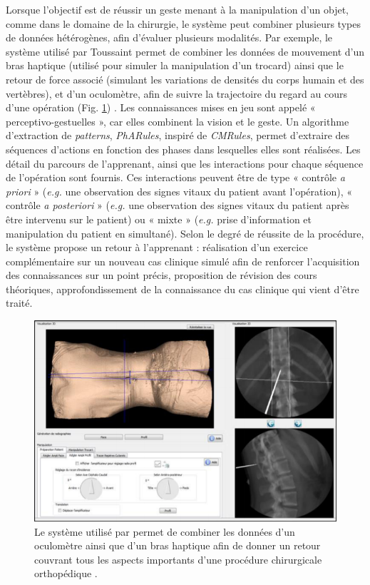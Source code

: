 Lorsque l'objectif est de réussir un geste menant à la manipulation d'un objet,  comme dans le domaine de la chirurgie, le système peut combiner plusieurs types de données hétérogènes, afin d'évaluer plusieurs modalités. Par exemple, le système utilisé par Toussaint  permet de combiner les données de mouvement d'un bras haptique (utilisé pour simuler la manipulation d'un trocard) ainsi que le retour de force associé (simulant les variations de densités du corps humain et des vertèbres), et d'un oculomètre, afin de suivre la trajectoire du regard au cours d'une opération (Fig. \ref{fig:eiah_toussaint}) \parencite{BMT_2015}. Les connaissances mises en jeu sont appelé « perceptivo-gestuelles », car elles combinent la vision et le geste. Un algorithme d'extraction de \textit{patterns}, \textit{PhARules}, inspiré de \textit{CMRules}, permet d'extraire des séquences d'actions en fonction des phases dans lesquelles elles sont réalisées. Les détail du parcours de l'apprenant, ainsi que les interactions pour chaque séquence de l'opération sont fournis. Ces interactions peuvent être de type « contrôle \textit{a priori} » (\textit{e.g.} une observation des signes vitaux du patient avant l'opération), « contrôle \textit{a posteriori} » (\textit{e.g.} une observation des signes vitaux du patient après être intervenu sur le patient) ou « mixte » (\textit{e.g.} prise d'information et manipulation du patient en simultané). Selon le degré de réussite de la procédure, le système propose un retour à l'apprenant : réalisation d'un exercice complémentaire sur un nouveau cas clinique simulé afin de renforcer l'acquisition des connaissances sur un point précis, proposition de révision des cours théoriques, approfondissement de la connaissance du cas clinique qui vient d'être traité.

\begin{figure}
    \centering
    \includegraphics[width=\textwidth]{pictures/eiah_toussaint.png}
    \caption[EIAH pour la chirurgie orthopédique \parencite{BMT_2015}]{Le système utilisé par \parencite{BMT_2015} permet de combiner les données d'un oculomètre ainsi que d'un bras haptique afin de donner un retour couvrant tous les aspects importants d'une procédure chirurgicale orthopédique \parencite{BMT_2015}.}
    \label{fig:eiah_toussaint}
\end{figure}

